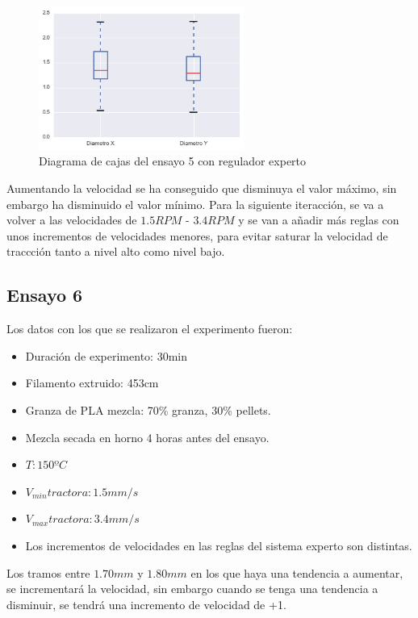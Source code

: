 \begin{figure}[H]
    \centering
    \includegraphics[width=0.6\textwidth]{images/producciones/13082015/output_10_e2.png}
    \caption{Diagrama de cajas del ensayo 5 con regulador experto}
    \label{fig:reg_cajas5}
\end{figure}

Aumentando la velocidad se ha conseguido que disminuya el valor máximo, sin embargo ha disminuido el valor mínimo. Para la siguiente iteracción, se va a volver a las velocidades de $1.5RPM$ - $3.4RPM$ y se van a añadir más reglas con unos incrementos de velocidades menores, para evitar saturar la velocidad de traccción tanto a nivel alto como nivel bajo.

\subsection{Ensayo 6}

Los datos con los que se realizaron el experimento fueron:

\begin{itemize}
	\item{Duración de experimento: 30min}
	\item{Filamento extruido: 453cm}
	\item{Granza de PLA mezcla: 70\% granza, 30\% pellets.}
	\item{Mezcla secada en horno 4 horas antes del ensayo.}
	\item{$T: 150ºC$}
	\item{$V_{min} tractora: 1.5 mm/s$}
	\item{$V_{max} tractora: 3.4 mm/s$}
	\item{Los incrementos de velocidades en las reglas del sistema experto son distintas.}
\end{itemize}

 Los tramos entre $1.70 mm$ y $1.80mm$ en los que haya una tendencia a aumentar, se incrementará la velocidad, sin embargo cuando se tenga una tendencia a disminuir, se tendrá una incremento de velocidad de +1.\\

